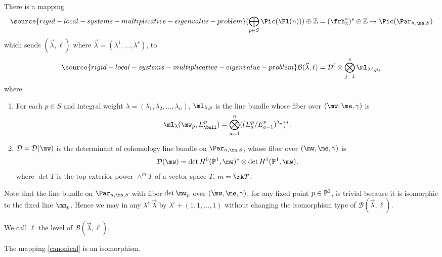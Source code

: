 \begin{defi}
\notready\label{levell}
There is a mapping
\begin{equation}\label{canonical}
\source{rigid-local-systems-multiplicative-eigenvalue-problem}
(\bigoplus_{p\in S} \Pic(\Fl(n)))\oplus \Bbb{Z}=(\frh_{\Bbb{Z}}^*)^s\oplus\Bbb{Z}\to \Pic (\Par_{n,\mn,S})
\end{equation}
which sends $(\vec{\lambda},\ell)$ where  $\vec{\lambda}=(\lambda^1,\dots,\lambda^s)$, to
\begin{equation}\label{bruckner}
\source{rigid-local-systems-multiplicative-eigenvalue-problem}
\mathcal{B}(\vec{\lambda},\ell)=\mathcal{D}^{\ell}\otimes \bigotimes_{j=1}^s\ml_{\lambda^j,p_j}
\end{equation}
where
\begin{enumerate}
\item[(i)] For each $p\in S$ and integral weight $\lambda=(\lambda_1,\lambda_2,\dots, \lambda_n)$, $\ml_{\lambda,p}$ is the line bundle whose fiber over
 $(\mw,\me,\gamma)$ is
  $$\ml_{\lambda}(\mw_p,E^p_{\bull})=\bigotimes_{a=1}^{n} ((E^p_a/E^p_{a-1})^{\lambda_a})^*.$$
\item [(ii)] $\mathcal{D}=\mathcal{D}(\mw)$ is the determinant of cohomology line bundle on $\Par_{n,\mn,S}$, whose fiber over $(\mw,\me,\gamma)$  is
$$\mathcal{D}(\mw)=\det H^0(\Bbb{P}^1,\mw)^*\otimes \det H^1(\Bbb{P}^1,\mw),$$
 where $\det T$  is the top exterior power $\wedge^m T$ of a vector space $T$, $m=\rk T$.
 \end{enumerate}

 Note that the line bundle on $\Par_{n,\mn,S}$ with fiber $\det \mw_p$ over $(\mw,\me,\gamma)$, for any fixed point $p\in\Bbb{P}^1$, is trivial because it is isomorphic to the fixed line $\mn_p$. Hence we may in  any $\lambda^i$ $\vec{\lambda}$ by $\lambda^i+(1,1,\dots,1)$ without changing the isomorphism type of
     $\mathcal{B}(\vec{\lambda},\ell)$.
\end{defi}

\begin{remark}
\notready\label{defL}
We call $\ell$ the level of $\mathcal{B}(\vec{\lambda},\ell)$.
\end{remark}

\begin{proposition}
\notready\label{LaSo}
The mapping \eqref{canonical} is an isomorphism.
\end{proposition}


